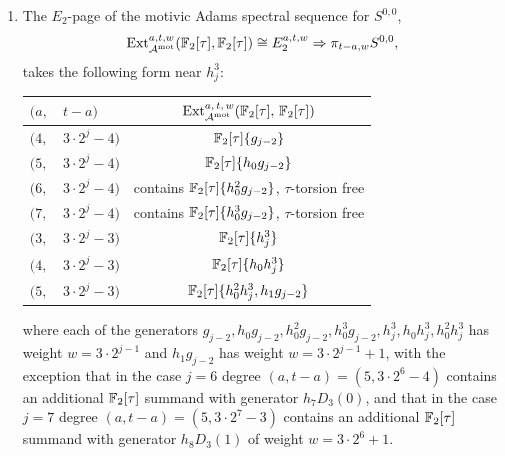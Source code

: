 \begin{thm}
\begin{enumerate}
  \item The $E_2$-page of the motivic Adams spectral sequence for $S^{0,0}$, 
    $$\operatorname{\mathrm{Ext}}^{a,t,w}_{\operatorname{\mathcal{A}}^\textup{mot}}(\mathbb{F}_2[\tau], \mathbb{F}_2[\tau]) \cong E_2^{a,t,w} \Rightarrow \pi_{t-a, w}S^{0,0},$$
    takes the following form near $h_j^3$:
    \begin{center}{\renewcommand{\arraystretch}{1.2}
        \begin{tabular}{|ll|c|}\hline
          $(a,$ & $t-a)$ & $\operatorname{\mathrm{Ext}}^{a,\,t,\,w}_{\operatorname{\mathcal{A}}^\textup{mot}}(\mathbb{F}_2[\tau],\, \mathbb{F}_2[\tau])$ \\\hline\hline
          $(4,$ & $ 3 \cdot 2^j-4)$ & $\operatorname{\mathbb{F}}_2[\tau]\{g_{j-2}\}$ \\\hline
          $(5,$ & $ 3 \cdot 2^j-4)$ & $\operatorname{\mathbb{F}}_2[\tau]\{h_0g_{j-2}\}$ \\\hline
          $(6,$ & $ 3 \cdot 2^j-4)$ & contains $\operatorname{\mathbb{F}}_2[\tau]\{h_0^2g_{j-2}\}$, $\tau$-torsion free \\\hline
          $(7,$ & $ 3 \cdot 2^j-4)$ & contains $\operatorname{\mathbb{F}}_2[\tau]\{h_0^3g_{j-2}\}$, $\tau$-torsion free \\\hline
          $(3,$ & $ 3 \cdot 2^j-3)$ & $\operatorname{\mathbb{F}}_2[\tau]\{h_j^3\}$ \\\hline
          $(4,$ & $ 3 \cdot 2^j-3)$ & $\operatorname{\mathbb{F}}_2[\tau]\{h_0h_j^3\}$ \\\hline
          $(5,$ & $ 3 \cdot 2^j-3)$ & $\operatorname{\mathbb{F}}_2[\tau]\{h_0^2h_j^3, h_1g_{j-2}\}$ \\\hline    
        \end{tabular}}
    \end{center}
    where each of the generators
    $g_{j-2}, h_0g_{j-2}, h_0^2g_{j-2}, h_0^3g_{j-2}, h_j^3, h_0h_j^3, h_0^2h_j^3$
    has weight $w = 3 \cdot 2^{j-1}$ and $h_1g_{j-2}$ has weight $w = 3 \cdot 2^{j-1}+1$, with the exception that
    in the case $j=6$ degree $(a,t-a)=(5,3 \cdot 2^{6} - 4)$ contains an additional $\operatorname{\mathbb{F}}_2[\tau]$ summand with generator $h_7D_3(0)$, and that
    in the case $j=7$ degree $(a,t-a)=(5,3 \cdot 2^{7} - 3)$ contains an additional $\operatorname{\mathbb{F}}_2[\tau]$ summand with generator $h_8D_3(1)$ of weight $w = 3 \cdot 2^{6}+1$.
    

\end{enumerate}
\end{thm}
